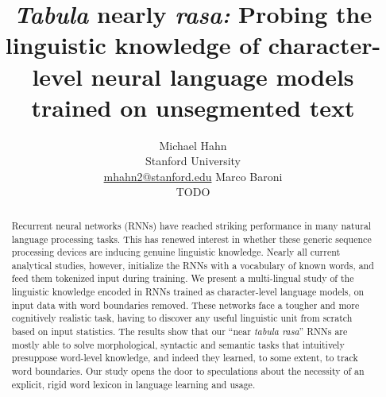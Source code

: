 

\title{\emph{Tabula} nearly \emph{rasa:} Probing the linguistic knowledge of character-level neural language models trained on unsegmented text}


%


\author{Michael Hahn \\ Stanford University \\ \url{mhahn2@stanford.edu} \And Marco Baroni \\ TODO}


\date{}

\hypersetup{draft}


\maketitle
\begin{abstract}
  Recurrent neural networks (RNNs) have reached striking performance in
  many natural language processing tasks. This has renewed interest in
  whether these generic sequence processing devices are inducing
  genuine linguistic knowledge. Nearly all current analytical studies,
  however, initialize the RNNs with a vocabulary of known words, and
  feed them tokenized input during training. We present a
  multi-lingual study of the linguistic knowledge encoded in RNNs
  trained as character-level language models, on input data with word
  boundaries removed. These networks face a tougher and more
  cognitively realistic task, having to discover any useful
  linguistic unit from scratch based on input statistics. The results
  show that our ``near \emph{tabula rasa}'' RNNs are mostly able to
  solve morphological, syntactic and semantic tasks that intuitively
  presuppose word-level knowledge, and indeed they learned, to some extent, to track
   word boundaries. Our study opens the door to speculations
  about the necessity of an explicit, rigid word lexicon in language learning and
  usage.
\end{abstract}


